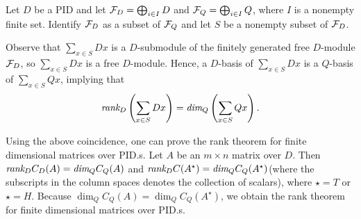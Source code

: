 \begin{exmp}
    Let $D$ be a PID and let ${\mathcal{F}}_D=\bigoplus_{i\in I} D$ and ${\mathcal{F}}_Q=\bigoplus_{i\in I}Q$, where $I$ is a nonempty finite set.
    Identify ${\mathcal{F}}_D$ as a subset of ${\mathcal{F}}_Q$ and let $S$ be a nonempty subset of ${\mathcal{F}}_D$.

    Observe that $\sum_{x\in S} Dx$ is a $D$-submodule of the finitely generated free $D$-module ${\mathcal{F}}_D$, so $\sum_{x\in S} Dx$ is a free $D$-module.
    Hence, a $D$-basis of $\sum_{x\in S} Dx$ is a $Q$-basis of $\sum_{x\in S} Qx$, implying that
    \begin{align*}
        \textit{rank}_D\left(\sum_{x\in S}Dx\right)=\textit{dim}_Q\left(\sum_{x\in S}Qx\right).
    \end{align*}

    Using the above coincidence, one can prove the rank theorem for finite dimensional matrices over PID.s.
    Let $A$ be an $m\times n$ matrix over $D$.
    Then $\textit{rank}_D C_D(A)=\textit{dim}_Q C_Q(A)$ and $\textit{rank}_D C(A^\star)=\textit{dim}_Q C_Q(A^\star)$(where the subscripts in the column spaces denotes the collection of scalars), where $\star=T$ or $\star=H$.
    Because $\dim_Q C_Q(A)=\dim_Q C_Q(A^\star)$, we obtain the rank theorem for finite dimensional matrices over PID.s.
\end{exmp}

